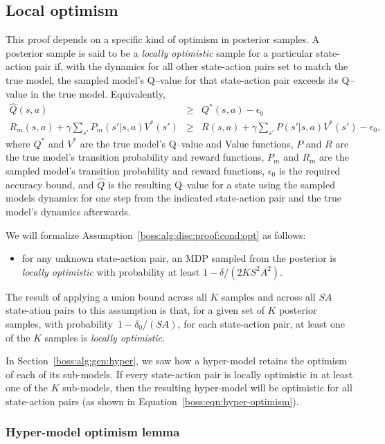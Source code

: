 \subsection{Local optimism}
\label{boss:alg:disc:proof:opt}
This proof depends on a specific kind of optimism in posterior samples. A posterior sample is said to be a \emph{locally optimistic} sample for a particular state-action pair if, with the dynamics for all other state-action pairs set to match the true model, the sampled model's Q--value for that state-action pair exceeds its Q--value in the true model. Equivalently,
\begin{eqnarray}
\label{boss:alg:disc:proof:opt}\hat Q(s,a) &\geq& Q^*(s, a) - \epsilon_0\\
R_m(s,a) +\gamma \sum_{s'} P_m(s'|s,a) V^*(s')&\geq&R(s,a) +\gamma \sum_{s'} P(s'|s,a) V^*(s') - \epsilon_0,
\end{eqnarray}
where $Q^*$ and $V^*$ are the true model's Q--value and Value functions, $P$ and $R$ are the true model's transition probability and reward functions, $P_m$ and $R_m$ are the sampled model's transition probability and reward functions, $\epsilon_0$ is the required accuracy bound, and $\hat Q$ is the resulting Q--value for a state using the sampled models dynamics for one step from the indicated state-action pair and the true model's dynamics afterwards.

We will formalize Assumption~\ref{boss:alg:disc:proof:cond:opt} as follows:
\begin{itemize}
\item for any unknown state-action pair, an MDP sampled from the posterior is \emph{locally optimistic} with probability at least $1-\delta/(2 K S^2 A^2)$.
\end{itemize}

The result of applying a union bound across all $K$ samples and across all $S A$ state-ation pairs to this assumption is that, for a given set of $K$ posterior samples, with probability~$1-\delta_0/(S A)$, for each state-action pair, at least one of the $K$ samples is \emph{locally optimistic}.

In Section~\ref{boss:alg:gen:hyper}, we saw how a hyper-model retains the optimism of each of its sub-models. If every state-action pair is locally optimistic in at least one of the $K$ sub-models, then the resulting hyper-model will be optimistic for all state-action pairs (as shown in Equation~\ref{boss:eqn:hyper-optimism}).

\subsubsection{Hyper-model optimism lemma}
\label{boss:alg:disc:proof:opt}

